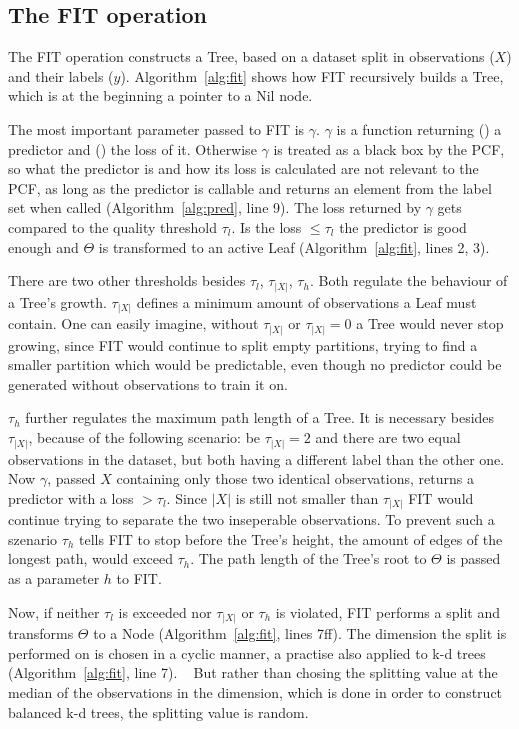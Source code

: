 \subsection{The FIT operation}

The FIT operation constructs a Tree, based on a dataset
split in observations ($X$) and their labels ($y$).
Algorithm~\ref{alg:fit} shows how FIT recursively builds a
Tree, which is at the beginning a pointer to a Nil node.

The most important parameter passed to FIT is $\gamma$.
$\gamma$ is a function returning () a
predictor and () the loss of it. Otherwise
$\gamma$ is treated as a black box by the PCF, so what the
predictor is and how its loss is calculated are not
relevant to the PCF, as long as the predictor is callable
and returns an element from the label set when called
(Algorithm~\ref{alg:pred}, line 9). The loss returned
by $\gamma$ gets compared to the quality threshold
$\tau_l$. Is the loss $\leq \tau_l$ the predictor is good
enough and $\Theta$ is transformed to an active Leaf
(Algorithm~\ref{alg:fit}, lines 2, 3).

There are two other thresholds besides $\tau_l$,
$\tau_{|X|}$, $\tau_h$. Both regulate the behaviour of a
Tree's growth. $\tau_{|X|}$ defines a minimum amount of
observations a Leaf must contain. One can easily imagine,
without $\tau_{|X|}$ or $\tau_{|X|} = 0$ a Tree would
never stop growing, since FIT would continue to split empty
partitions, trying to find a smaller partition which would
be predictable, even though no predictor could be
generated without observations to train it on.

$\tau_h$ further regulates the maximum path length of a
Tree. It is necessary besides $\tau_{|X|}$, because of the
following scenario: be $\tau_{|X|} = 2$ and there are two
equal observations in the dataset, but both having a
different label than the other one. Now $\gamma$, passed
$X$ containing only those two identical observations,
returns a predictor with a loss $> \tau_l$. Since $|X|$ is
still not smaller than $\tau_{|X|}$ FIT would continue
trying to separate the two inseperable observations. To
prevent such a szenario $\tau_h$ tells FIT to stop before
the Tree's height, the amount of edges of the longest path,
would exceed $\tau_h$. The path length of the Tree's root
to $\Theta$ is passed as a parameter $h$ to FIT.

Now, if neither $\tau_l$ is exceeded nor $\tau_{|X|}$ or
$\tau_h$ is violated, FIT performs a split and transforms
$\Theta$ to a Node (Algorithm~\ref{alg:fit}, lines 7ff).
The dimension the split is performed on is chosen in a
cyclic manner, a practise also applied to k-d trees
(Algorithm~\ref{alg:fit}, line 7).%
~\cite{Brown2015kdtree}
But rather than chosing the splitting value at the median
of the observations in the dimension, which is done in
order to construct balanced k-d trees, the splitting value
is random.\cite{Brown2015kdtree}

